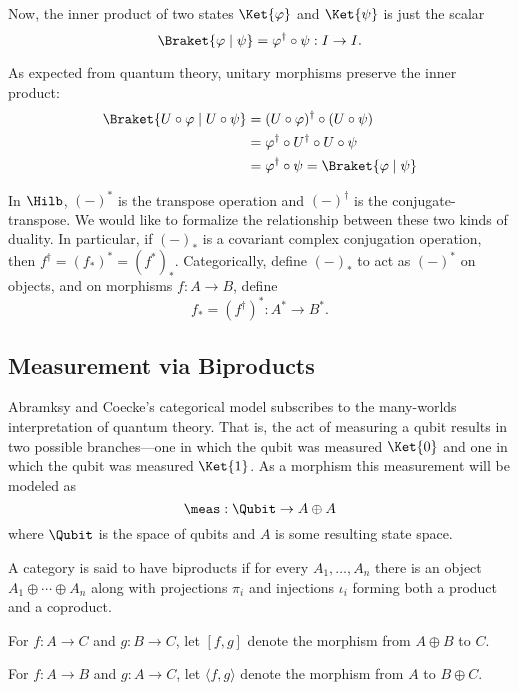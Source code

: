 Now, the inner product of two states $\Ket{\varphi}$ and $\Ket{\psi}$
is just the scalar
\[ \Braket{\varphi \mid \psi} = \varphi^\dagger \circ \psi : I \rightarrow I. \]

As expected from quantum theory, unitary morphisms preserve the inner product:
\begin{align*}
    \Braket{U\circ \varphi \mid U \circ \psi}
    &= (U \circ \varphi)^\dagger \circ (U \circ \psi) \\
    &= \varphi^\dagger \circ U^\dagger \circ U \circ \psi \\
    &= \varphi^\dagger \circ \psi = \Braket{\varphi \mid \psi}
\end{align*}

In $\Hilb$, $(-)^*$ is the transpose operation and $(-)^\dagger$ is the conjugate-transpose.
We would like to formalize the relationship between these two kinds of duality. 
In particular, if $(-)_*$ is a covariant complex conjugation operation, then 
$f^\dagger = (f_*)^* = (f^*)_*$. Categorically, define $(-)_*$ to act as $(-)^*$ on objects, 
and on morphisms $f: A \rightarrow B$, define 
\[ f_* = (f^\dagger)^* : A^* \rightarrow B^*. \]

\subsection{Measurement via Biproducts}

Abramksy and Coecke's categorical model subscribes to the many-worlds interpretation of quantum
theory. That is, the act of measuring a qubit results in two possible branches---one in 
which the qubit was measured $\Ket{0}$ and one in which the qubit was measured $\Ket{1}$.
As a morphism this measurement will be modeled as
\[ \meas : \Qubit \rightarrow A \oplus A \]
where $\Qubit$ is the space of qubits and $A$ is some resulting state space.

\begin{definition}
    A category is said to have biproducts if for every $A_1,\ldots,A_n$
    there is an object $A_1 \oplus \cdots \oplus A_n$ along with
    projections $\pi_i$ and injections $\iota_i$ forming both a product and a coproduct.
    
    For $f : A \rightarrow C$ and $g : B \rightarrow C$, let $[f,g]$
    denote the morphism from $A \oplus B$ to $C$.

    For $f : A \rightarrow B$ and $g : A \rightarrow C$, let $\langle f,g\rangle$ denote
    the morphism from $A$ to $B \oplus C$.
\end{definition}

